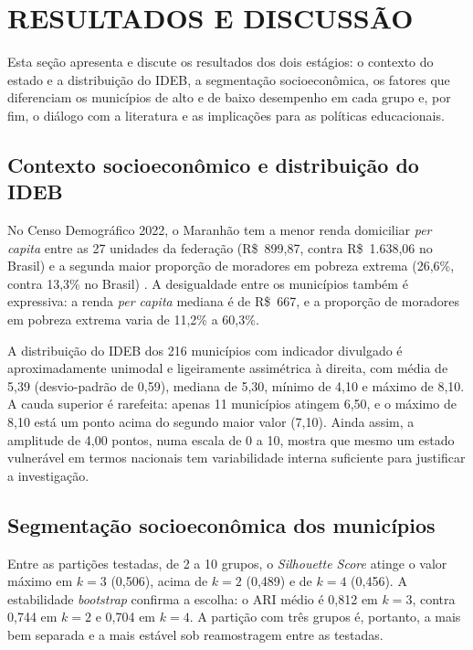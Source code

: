 \section{RESULTADOS E DISCUSSÃO}
\label{sec:resultados}

Esta seção apresenta e discute os resultados dos dois estágios: o contexto do estado e a distribuição do IDEB, a segmentação socioeconômica, os fatores que diferenciam os municípios de alto e de baixo desempenho em cada grupo e, por fim, o diálogo com a literatura e as implicações para as políticas educacionais.

\subsection{Contexto socioeconômico e distribuição do IDEB}

No Censo Demográfico 2022, o Maranhão tem a menor renda domiciliar \textit{per capita} entre as 27 unidades da federação (R\$~899,87, contra R\$~1.638,06 no Brasil) \parencite{ibge2022} e a segunda maior proporção de moradores em pobreza extrema (26,6\%, contra 13,3\% no Brasil) \parencite{ibge2022classes}. A desigualdade entre os municípios também é expressiva: a renda \textit{per capita} mediana é de R\$~667, e a proporção de moradores em pobreza extrema varia de 11,2\% a 60,3\%.

A distribuição do IDEB dos 216 municípios com indicador divulgado é aproximadamente unimodal e ligeiramente assimétrica à direita, com média de 5,39 (desvio-padrão de 0,59), mediana de 5,30, mínimo de 4,10 e máximo de 8,10. A cauda superior é rarefeita: apenas 11 municípios atingem 6,50, e o máximo de 8,10 está um ponto acima do segundo maior valor (7,10). Ainda assim, a amplitude de 4,00 pontos, numa escala de 0 a 10, mostra que mesmo um estado vulnerável em termos nacionais tem variabilidade interna suficiente para justificar a investigação.

\subsection{Segmentação socioeconômica dos municípios}

Entre as partições testadas, de 2 a 10 grupos, o \textit{Silhouette Score} atinge o valor máximo em $k = 3$ (0,506), acima de $k = 2$ (0,489) e de $k = 4$ (0,456). A estabilidade \textit{bootstrap} confirma a escolha: o ARI médio é 0,812 em $k = 3$, contra 0,744 em $k = 2$ e 0,704 em $k = 4$. A partição com três grupos é, portanto, a mais bem separada e a mais estável sob reamostragem entre as testadas.

